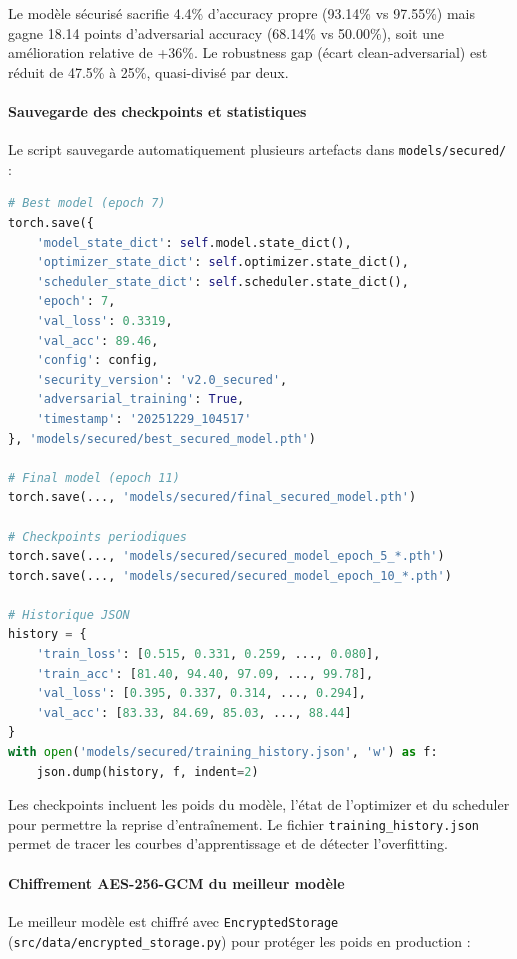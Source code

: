 Le modèle sécurisé sacrifie 4.4\% d'accuracy propre (93.14\% vs 97.55\%) mais gagne 18.14 points d'adversarial accuracy (68.14\% vs 50.00\%), soit une amélioration relative de +36\%. Le robustness gap (écart clean-adversarial) est réduit de 47.5\% à 25\%, quasi-divisé par deux.

\paragraph{Sauvegarde des checkpoints et statistiques}

Le script sauvegarde automatiquement plusieurs artefacts dans \texttt{models/secured/} :

\begin{lstlisting}[language=Python, caption=Sauvegarde des modèles et statistiques]
# Best model (epoch 7)
torch.save({
    'model_state_dict': self.model.state_dict(),
    'optimizer_state_dict': self.optimizer.state_dict(),
    'scheduler_state_dict': self.scheduler.state_dict(),
    'epoch': 7,
    'val_loss': 0.3319,
    'val_acc': 89.46,
    'config': config,
    'security_version': 'v2.0_secured',
    'adversarial_training': True,
    'timestamp': '20251229_104517'
}, 'models/secured/best_secured_model.pth')

# Final model (epoch 11)
torch.save(..., 'models/secured/final_secured_model.pth')

# Checkpoints periodiques
torch.save(..., 'models/secured/secured_model_epoch_5_*.pth')
torch.save(..., 'models/secured/secured_model_epoch_10_*.pth')

# Historique JSON
history = {
    'train_loss': [0.515, 0.331, 0.259, ..., 0.080],
    'train_acc': [81.40, 94.40, 97.09, ..., 99.78],
    'val_loss': [0.395, 0.337, 0.314, ..., 0.294],
    'val_acc': [83.33, 84.69, 85.03, ..., 88.44]
}
with open('models/secured/training_history.json', 'w') as f:
    json.dump(history, f, indent=2)
\end{lstlisting}

Les checkpoints incluent les poids du modèle, l'état de l'optimizer et du scheduler pour permettre la reprise d'entraînement. Le fichier \texttt{training\_history.json} permet de tracer les courbes d'apprentissage et de détecter l'overfitting.

\paragraph{Chiffrement AES-256-GCM du meilleur modèle}

Le meilleur modèle est chiffré avec \texttt{EncryptedStorage} (\texttt{src/data/encrypted\_storage.py}) pour protéger les poids en production :


